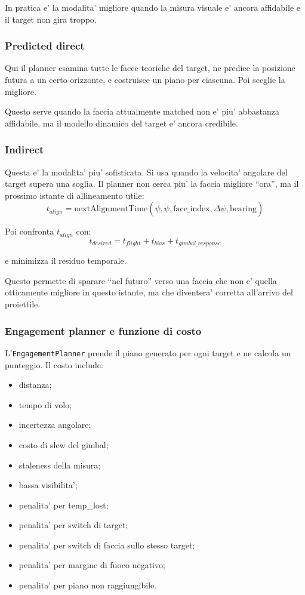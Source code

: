 \documentclass[11pt,a4paper]{article}
\newcommand{\code}[1]{\texttt{#1}}
\begin{document}
In pratica e' la modalita' migliore quando la misura visuale e' ancora affidabile e il target non gira troppo.

\subsubsection{Predicted direct}

Qui il planner esamina tutte le facce teoriche del target, ne predice la posizione futura a un certo orizzonte, e costruisce un piano per ciascuna. Poi sceglie la migliore.

Questo serve quando la faccia attualmente matched non e' piu' abbastanza affidabile, ma il modello dinamico del target e' ancora credibile.

\subsubsection{Indirect}

Questa e' la modalita' piu' sofisticata. Si usa quando la velocita' angolare del target supera una soglia. Il planner non cerca piu' la faccia migliore ``ora'', ma il prossimo istante di allineamento utile:
\begin{equation}
  t_{align} = \text{nextAlignmentTime}(\psi, \dot{\psi}, \text{face\_index}, \Delta\psi, \text{bearing})
\end{equation}

Poi confronta \(t_{align}\) con:
\begin{equation}
  t_{desired} = t_{flight} + t_{bias} + t_{gimbal\_response}
\end{equation}

e minimizza il residuo temporale.

Questo permette di sparare ``nel futuro'' verso una faccia che non e' quella otticamente migliore in questo istante, ma che diventera' corretta all'arrivo del proiettile.

\subsubsection{Engagement planner e funzione di costo}

L'\code{EngagementPlanner} prende il piano generato per ogni target e ne calcola un punteggio. Il costo include:
\begin{itemize}[leftmargin=1.4em]
  \item distanza;
  \item tempo di volo;
  \item incertezza angolare;
  \item costo di slew del gimbal;
  \item staleness della misura;
  \item bassa visibilita';
  \item penalita' per temp\_lost;
  \item penalita' per switch di target;
  \item penalita' per switch di faccia sullo stesso target;
  \item penalita' per margine di fuoco negativo;
  \item penalita' per piano non raggiungibile.
\end{itemize}
\end{document}

